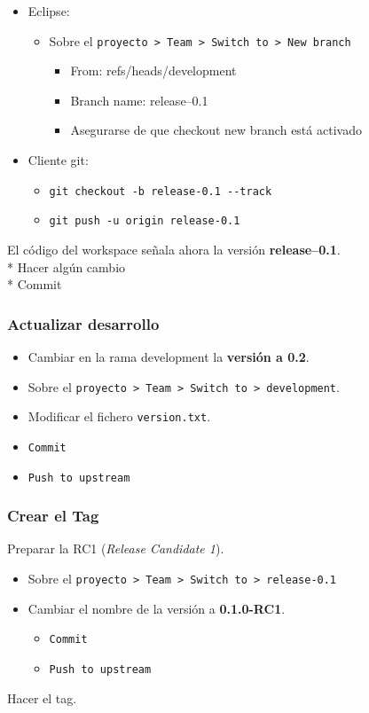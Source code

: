 \begin{itemize}
\item
  Eclipse:
  \begin{itemize}
  \item
    Sobre el
    \texttt{proyecto \textgreater{} Team \textgreater{} Switch to \textgreater{} New branch}
    \begin{itemize}
    \item
      From: refs/heads/development
    \item
      Branch name: release--0.1
    \item
      Asegurarse de que checkout new branch está activado
    \end{itemize}
  \end{itemize}
\item
  Cliente git:
  \begin{itemize}
  \item
    \texttt{git checkout -b release-0.1 -{}-track}
  \item
    \texttt{git push -u origin release-0.1}
  \end{itemize}
\end{itemize}
El código del workspace señala ahora la versión
\textbf{release--0.1}.\\* Hacer algún cambio\\* Commit

\subsubsection{Actualizar desarrollo}

\begin{itemize}
\item
  Cambiar en la rama development la \textbf{versión a 0.2}.
\item
  Sobre el
  \texttt{proyecto \textgreater{} Team \textgreater{} Switch to \textgreater{} development}.
\item
  Modificar el fichero \texttt{version.txt}.
\item
  \texttt{Commit}
\item
  \texttt{Push to upstream}
\end{itemize}
\subsubsection{Crear el Tag}

Preparar la RC1 (\emph{Release Candidate 1}).

\begin{itemize}
\item
  Sobre el
  \texttt{proyecto \textgreater{} Team \textgreater{} Switch to \textgreater{} release-0.1}
\item
  Cambiar el nombre de la versión a \textbf{0.1.0-RC1}.
  \begin{itemize}
  \item
    \texttt{Commit}
  \item
    \texttt{Push to upstream}
  \end{itemize}
\end{itemize}
Hacer el tag.

